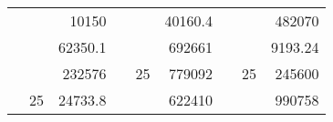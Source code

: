 \begin{table}[]
\begin{tabular}{|ccrccrccr}
\rowcolor[HTML]{DAE8FC} 
\multicolumn{1}{|c|}{\cellcolor[HTML]{FFFFC7}}                                & \multicolumn{1}{c|}{\cellcolor[HTML]{DAE8FC}}                      & \multicolumn{1}{r|}{\cellcolor[HTML]{DAE8FC}10150}     & \multicolumn{1}{c|}{\cellcolor[HTML]{FFFFC7}}                                & \multicolumn{1}{c|}{\cellcolor[HTML]{DAE8FC}}                       & \multicolumn{1}{r|}{\cellcolor[HTML]{DAE8FC}40160.4}   & \multicolumn{1}{c|}{\cellcolor[HTML]{FFFFC7}}                                & \multicolumn{1}{c|}{\cellcolor[HTML]{DAE8FC}}                      & \multicolumn{1}{r|}{\cellcolor[HTML]{DAE8FC}482070}    \\ \cline{3-3} \cline{6-6} \cline{9-9} 
\multicolumn{1}{|c|}{\cellcolor[HTML]{FFFFC7}}                                & \multicolumn{1}{c|}{\cellcolor[HTML]{DAE8FC}}                      & \multicolumn{1}{r|}{\cellcolor[HTML]{DDFDFF}62350.1}   & \multicolumn{1}{c|}{\cellcolor[HTML]{FFFFC7}}                                & \multicolumn{1}{c|}{\cellcolor[HTML]{DAE8FC}}                       & \multicolumn{1}{r|}{\cellcolor[HTML]{DDFDFF}692661}    & \multicolumn{1}{c|}{\cellcolor[HTML]{FFFFC7}}                                & \multicolumn{1}{c|}{\cellcolor[HTML]{DAE8FC}}                      & \multicolumn{1}{r|}{\cellcolor[HTML]{DDFDFF}9193.24}   \\ \cline{3-3} \cline{6-6} \cline{9-9} 
\rowcolor[HTML]{DAE8FC} 
\multicolumn{1}{|c|}{\cellcolor[HTML]{FFFFC7}}                                & \multicolumn{1}{c|}{\cellcolor[HTML]{DAE8FC}}                      & \multicolumn{1}{r|}{\cellcolor[HTML]{DAE8FC}232576}    & \multicolumn{1}{c|}{\cellcolor[HTML]{FFFFC7}}                                & \multicolumn{1}{c|}{\multirow{-9}{*}{\cellcolor[HTML]{DAE8FC}25}}   & \multicolumn{1}{r|}{\cellcolor[HTML]{DAE8FC}779092}    & \multicolumn{1}{c|}{\cellcolor[HTML]{FFFFC7}}                                & \multicolumn{1}{c|}{\multirow{-9}{*}{\cellcolor[HTML]{DAE8FC}25}}  & \multicolumn{1}{r|}{\cellcolor[HTML]{DAE8FC}245600}    \\ \cline{3-3} \cline{5-6} \cline{8-9} 
\multicolumn{1}{|c|}{\cellcolor[HTML]{FFFFC7}}                                & \multicolumn{1}{c|}{\multirow{-10}{*}{\cellcolor[HTML]{DAE8FC}25}} & \multicolumn{1}{r|}{\cellcolor[HTML]{DDFDFF}24733.8}   & \multicolumn{1}{c|}{\cellcolor[HTML]{FFFFC7}}                                & \multicolumn{1}{c|}{\cellcolor[HTML]{DDFDFF}}                       & \multicolumn{1}{r|}{\cellcolor[HTML]{DAE8FC}622410}    & \multicolumn{1}{c|}{\cellcolor[HTML]{FFFFC7}}                                & \multicolumn{1}{c|}{\cellcolor[HTML]{DDFDFF}}                      & \multicolumn{1}{r|}{\cellcolor[HTML]{DAE8FC}990758}    \\ \cline{2-3} \cline{6-6} \cline{9-9} 

\end{tabular}
\end{table}
